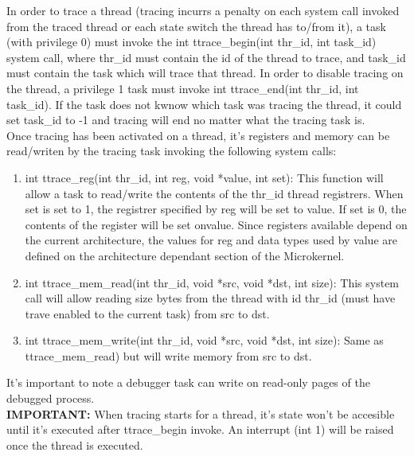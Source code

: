 \documentclass[11pt, letterpaper, twoside, english]{book}
\begin{document}
In order to trace a thread (tracing incurrs a penalty on each system call invoked from the traced thread or each state switch the thread has to/from it), a task (with privilege 0) must invoke the \textsf{int ttrace\_begin(int thr\_id, int task\_id)} system call, where \textsf{thr\_id} must contain the id of the thread to trace, and \textsf{task\_id} must contain the task which will trace that thread. In order to disable tracing on the thread, a privilege 1 task must invoke \textsf{int ttrace\_end(int thr\_id, int task\_id)}. If the task does not kwnow which task was tracing the thread, it could set \textsf{task\_id} to -1 and tracing will end no matter what the tracing task is.\\

Once tracing has been activated on a thread, it's registers and memory can be read/writen by the tracing task invoking the following system calls:

\begin{enumerate}
\item[] \textsf{int ttrace\_reg(int thr\_id, int reg, void *value, int set)}: This function will allow a task to read/write the contents of the \textsf{thr\_id} thread registrers. When \textsf{set} is set to 1, the registrer specified by \textsf{reg} will be set to \textsf{value}. If \textsf{set} is 0, the contents of the register will be set on\textsf{value}. Since registers available depend on the current architecture, the values for \textsf{reg} and data types used by \textsf{value} are defined on the architecture dependant section of the Microkernel.
\item[] \textsf{int ttrace\_mem\_read(int thr\_id, void *src, void *dst, int size)}: This system call will allow reading \textsf{size} bytes from the thread with id \textsf{thr\_id} (must have trave enabled to the current task) from \textsf{src} to \textsf{dst}.
\item[] \textsf{int ttrace\_mem\_write(int thr\_id, void *src, void *dst, int size)}: Same as \textsf{ttrace\_mem\_read}) but will write memory from \textsf{src} to \textsf{dst}.
\end{enumerate}

It's important to note a debugger task can write on read-only pages of the debugged process.\\

\textbf{IMPORTANT:} When tracing starts for a thread, it's state won't be accesible until it's executed after \textsf{ttrace\_begin} invoke. An interrupt (int 1) will be raised once the thread is executed.\\
\end{document}
